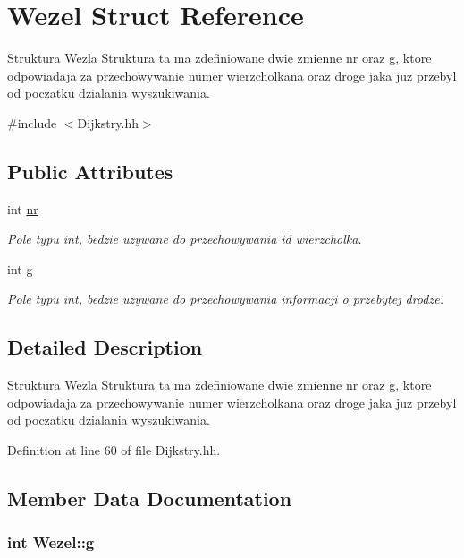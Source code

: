 \hypertarget{struct_wezel}{\section{Wezel Struct Reference}
\label{struct_wezel}
}


Struktura Wezla Struktura ta ma zdefiniowane dwie zmienne nr oraz g, ktore odpowiadaja za przechowywanie numer wierzcholkana oraz droge jaka juz przebyl od poczatku dzialania wyszukiwania.  




{\ttfamily \#include $<$Dijkstry.\-hh$>$}

\subsection*{Public Attributes}
\begin{DoxyCompactItemize}
\item 
int \hyperlink{struct_wezel_ab6bc8ea479ff25001606d388bbd7ccd0}{nr}
\begin{DoxyCompactList}\small\item\em Pole typu int, bedzie uzywane do przechowywania id wierzcholka. \end{DoxyCompactList}\item 
int \hyperlink{struct_wezel_ab8cc87757f857deaca9fdb3842b0c455}{g}
\begin{DoxyCompactList}\small\item\em Pole typu int, bedzie uzywane do przechowywania informacji o przebytej drodze. \end{DoxyCompactList}\end{DoxyCompactItemize}


\subsection{Detailed Description}
Struktura Wezla Struktura ta ma zdefiniowane dwie zmienne nr oraz g, ktore odpowiadaja za przechowywanie numer wierzcholkana oraz droge jaka juz przebyl od poczatku dzialania wyszukiwania. 

Definition at line 60 of file Dijkstry.\-hh.



\subsection{Member Data Documentation}
\hypertarget{struct_wezel_ab8cc87757f857deaca9fdb3842b0c455}{
\subsubsection[{g}]{\setlength{\rightskip}{0pt plus 5cm}int Wezel\-::g}}\label{struct_wezel_ab8cc87757f857deaca9fdb3842b0c455}


